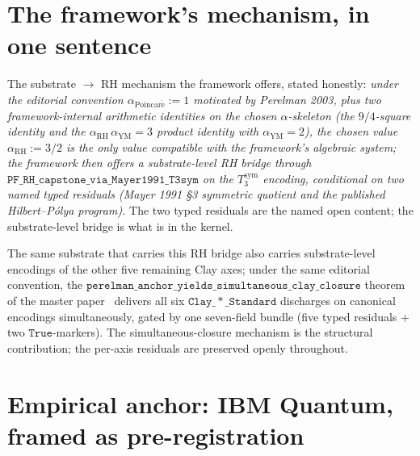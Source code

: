 \documentclass[11pt,a4paper]{article}
\theoremstyle{plain}
\theoremstyle{definition}
\begin{document}
\section{The framework's mechanism, in one sentence}
\label{sec:mechanism}

The substrate $\to$ RH mechanism the framework offers, stated
honestly: \emph{under the editorial convention
$\alpha_{\mathrm{Poincar\acute e}} := 1$ motivated by Perelman 2003,
plus two framework-internal arithmetic identities on the chosen
$\alpha$-skeleton (the $9/4$-square identity and the
$\alpha_{\mathrm{RH}}\,\alpha_{\mathrm{YM}} = 3$ product identity
with $\alpha_{\mathrm{YM}} = 2$), the chosen value
$\alpha_{\mathrm{RH}} := 3/2$ is the only value compatible with the
framework's algebraic system; the framework then offers a
substrate-level RH bridge through
$\mathtt{PF\_RH\_capstone\_via\_Mayer1991\_T3sym}$ on the
$T_{3}^{\mathrm{sym}}$ encoding, conditional on two named typed
residuals (Mayer 1991 \S3 symmetric quotient and the published
Hilbert--P\'olya program).} The two typed residuals are the named
open content; the substrate-level bridge is what is in the kernel.

The same substrate that carries this RH bridge also carries
substrate-level encodings of the other five remaining Clay axes;
under the same editorial convention, the
$\mathtt{perelman\_anchor\_yields\_simultaneous\_clay\_closure}$
theorem of the master paper~\cite{master_substrate} delivers all six
$\mathtt{Clay\_*\_Standard}$ discharges on canonical encodings
simultaneously, gated by one seven-field bundle (five typed
residuals + two $\mathtt{True}$-markers). The simultaneous-closure
mechanism is the structural contribution; the per-axis residuals are
preserved openly throughout.

\section{Empirical anchor: IBM Quantum, framed as pre-registration}
\label{sec:ibm}
\end{document}
